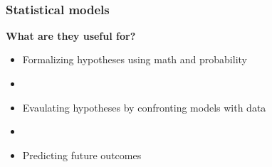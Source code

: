 \documentclass[color=usenames,dvipsnames]{beamer}\usepackage[]{graphicx}\usepackage[]{color}
\begin{document}
\begin{frame}
\begin{columns}
\begin{column}{0.15\textwidth}
       \\
    \end{column}
  \end{columns}
\end{frame}




\begin{frame}
  \frametitle{Statistical models}
  \large
  {\bf What are they \alert{useful} for?}
  \begin{itemize}%
    \item<2-> Formalizing hypotheses using math and probability
    \item[]
    \item<3-> Evaulating hypotheses by confronting models with data
    \item[]
    \item<4-> Predicting future outcomes
  \end{itemize}
\end{frame}
\end{document}
